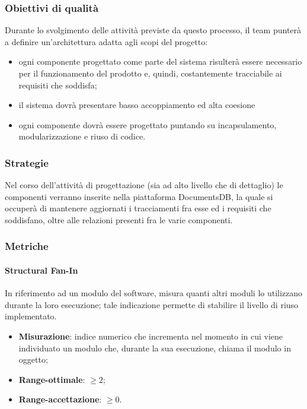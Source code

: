 \subsubsection{Obiettivi di qualità}
Durante lo svolgimento delle attività previste da questo processo, il team punterà a definire un'architettura adatta agli scopi del progetto:
\begin{itemize}
\item ogni componente progettato come parte del sistema risulterà essere necessario per il funzionamento del prodotto e, quindi, costantemente tracciabile ai requisiti che soddisfa;
\item il sistema dovrà presentare basso accoppiamento ed alta coesione
\item ogni componente dovrà essere progettato puntando su incapsulamento, modularizzazione e riuso di codice.
\end{itemize}
\subsubsection{Strategie}
Nel corso dell'attività di progettazione (sia ad alto livello che di dettaglio) le componenti verranno inserite nella piattaforma DocumentsDB, la quale si occuperà di mantenere aggiornati i tracciamenti fra esse ed i requisiti che soddisfano, oltre alle relazioni presenti fra le varie componenti.
\subsubsection{Metriche}
\paragraph{Structural Fan-In}
In riferimento ad un modulo del software, misura quanti altri moduli lo utilizzano durante la loro esecuzione; tale indicazione permette di stabilire il livello di riuso implementato.
\begin{itemize}
\item \textbf{Misurazione}: indice numerico che incrementa nel momento in cui viene individuato un modulo che, durante la sua esecuzione, chiama il modulo in oggetto;
\item \textbf{Range-ottimale}: $\geq 2$;
\item \textbf{Range-accettazione}: $\geq 0$.
\end{itemize}
